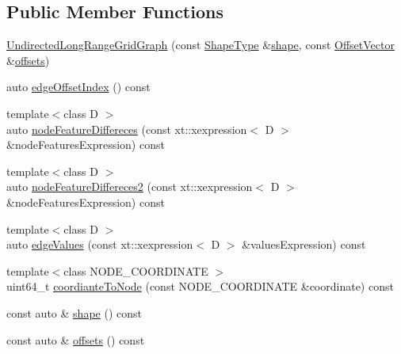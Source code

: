 \subsection*{Public Member Functions}
\begin{DoxyCompactItemize}
\item 
\hyperlink{classnifty_1_1graph_1_1UndirectedLongRangeGridGraph_a6dc33ffd84f88fe4e15c463e51435e07}{Undirected\+Long\+Range\+Grid\+Graph} (const \hyperlink{classnifty_1_1graph_1_1UndirectedLongRangeGridGraph_a59b2f5f607a442d6aedb1ddd5ca53d50}{Shape\+Type} \&\hyperlink{classnifty_1_1graph_1_1UndirectedLongRangeGridGraph_ac65c15cf1960267a284c8f7647386484}{shape}, const \hyperlink{classnifty_1_1graph_1_1UndirectedLongRangeGridGraph_a74078f6c712f2f257bfbfd62c7d8b902}{Offset\+Vector} \&\hyperlink{classnifty_1_1graph_1_1UndirectedLongRangeGridGraph_a0ca3608b3c18ffdaa23aa78886ca203a}{offsets})
\item 
auto \hyperlink{classnifty_1_1graph_1_1UndirectedLongRangeGridGraph_aca6e797834ea50def5d1c266dcf6c859}{edge\+Offset\+Index} () const
\item 
{\footnotesize template$<$class D $>$ }\\auto \hyperlink{classnifty_1_1graph_1_1UndirectedLongRangeGridGraph_a16ea3b3fe14f4536380bc6b561444c54}{node\+Feature\+Differeces} (const xt\+::xexpression$<$ D $>$ \&node\+Features\+Expression) const
\item 
{\footnotesize template$<$class D $>$ }\\auto \hyperlink{classnifty_1_1graph_1_1UndirectedLongRangeGridGraph_abd817b6bfc8a0748146b406e99688d45}{node\+Feature\+Differeces2} (const xt\+::xexpression$<$ D $>$ \&node\+Features\+Expression) const
\item 
{\footnotesize template$<$class D $>$ }\\auto \hyperlink{classnifty_1_1graph_1_1UndirectedLongRangeGridGraph_a293b184a26e4a6d7dfa2d1a125a32a85}{edge\+Values} (const xt\+::xexpression$<$ D $>$ \&values\+Expression) const
\item 
{\footnotesize template$<$class N\+O\+D\+E\+\_\+\+C\+O\+O\+R\+D\+I\+N\+A\+TE $>$ }\\uint64\+\_\+t \hyperlink{classnifty_1_1graph_1_1UndirectedLongRangeGridGraph_a45303228fbd25cb46ec9bef4bf0d29f7}{coordiante\+To\+Node} (const N\+O\+D\+E\+\_\+\+C\+O\+O\+R\+D\+I\+N\+A\+TE \&coordinate) const
\item 
const auto \& \hyperlink{classnifty_1_1graph_1_1UndirectedLongRangeGridGraph_ac65c15cf1960267a284c8f7647386484}{shape} () const
\item 
const auto \& \hyperlink{classnifty_1_1graph_1_1UndirectedLongRangeGridGraph_a0ca3608b3c18ffdaa23aa78886ca203a}{offsets} () const
\end{DoxyCompactItemize}
